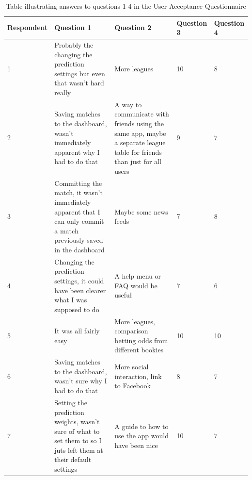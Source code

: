 \noindent
\begin{table}
\begin{tabular}{
  |p{}%
  |p{}%
  |p{}%
  |p{}%
  |p{}|%
  }
  \hline
  \centering Respondent  & \centering Question 1  & \centering Question 2 &  \centering Question 3 & \centering\arraybackslash Question 4   \\ \hline
  1  & Probably the changing the prediction settings but even that wasn't hard really & More leagues & 10 & 8 \\ \hline
  2 & Saving matches to the dashboard, wasn't immediately apparent why I had to do that & A way to communicate with friends using the same app, maybe a separate league table for friends than just for all users & 9 & 7 \\ \hline
 3 & Committing the match, it wasn't immediately apparent that I can only commit a match previously saved in the dashboard & Maybe some news feeds & 7 & 8 \\ \hline
  4 &  Changing the prediction settings, it could have been clearer what I was supposed to do & A help menu or FAQ would be useful & 7 & 6 \\ \hline
  5 &  It was all fairly easy & More leagues, comparison betting odds from different bookies & 10 & 10 \\ \hline
  6 &  Saving matches to the dashboard, wasn't sure why I had to do that & More social interaction, link to Facebook & 8 & 7 \\ \hline
  7 &  Setting the prediction weights, wasn't sure of what to set them to so I juts left them at their default settings & A guide to how to use the app would have been nice & 10 & 7 \\ \hline

  \end{tabular}
 \caption{Table illustrating answers to questions 1-4 in the User Acceptance Questionnaire}

\end{table}

